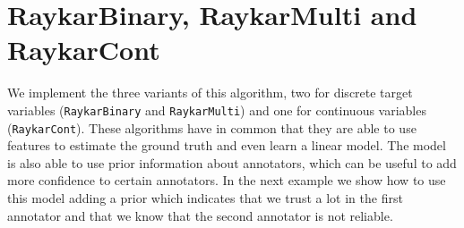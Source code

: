 \documentclass[letterpaper,10pt,english]{sphinxmanual}
\begin{document}
\section{RaykarBinary, RaykarMulti and RaykarCont}
\label{\detokenize{usage/examples:raykarbinary-raykarmulti-and-raykarcont}}
We implement the three variants of this algorithm, two for discrete target variables (\texttt{RaykarBinary} and \texttt{RaykarMulti}) 
and one for continuous variables (\texttt{RaykarCont}).
These algorithms have in common that they are able to use features to estimate the ground truth
and even learn a linear model. The model is also able to use prior information about annotators,
which can be useful to add more confidence to certain annotators. In the next example we show
how to use this model adding a prior which indicates that we trust a lot in the first annotator
and that we know that the second annotator is not reliable.
\end{document}
